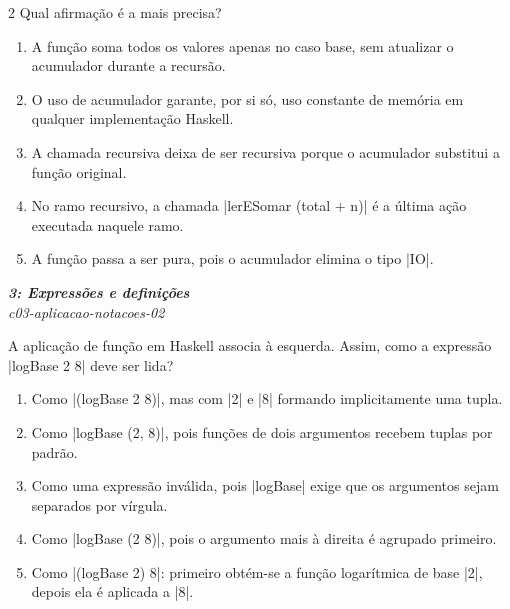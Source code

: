 \documentclass[a4paper,10pt,brazil]{article}
\begin{document}
\begin{multicols}{2}
Qual afirmação é a mais precisa?

\begin{enumerate}
  \item A função soma todos os valores apenas no caso base, sem atualizar o acumulador durante a recursão.

  \item O uso de acumulador garante, por si só, uso constante de memória em qualquer implementação Haskell.

  \item A chamada recursiva deixa de ser recursiva porque o acumulador substitui a função original.

  \item No ramo recursivo, a chamada \haskellinline|lerESomar (total + n)| é a última ação executada naquele ramo.

  \item A função passa a ser pura, pois o acumulador elimina o tipo \haskellinline|IO|.


\end{enumerate}

\begin{flushright}
  \footnotesize
  \textit{\textbf{3: Expressões e definições}}\\
  \textit{c03-aplicacao-notacoes-02}\\

\end{flushright}
A aplicação de função em Haskell associa à esquerda. Assim, como a expressão \haskellinline|logBase 2 8| deve ser lida?

\begin{enumerate}
  \item Como \haskellinline|(logBase 2 8)|, mas com \haskellinline|2| e \haskellinline|8| formando implicitamente uma tupla.

  \item Como \haskellinline|logBase (2, 8)|, pois funções de dois argumentos recebem tuplas por padrão.

  \item Como uma expressão inválida, pois \haskellinline|logBase| exige que os argumentos sejam separados por vírgula.

  \item Como \haskellinline|logBase (2 8)|, pois o argumento mais à direita é agrupado primeiro.

  \item Como \haskellinline|(logBase 2) 8|: primeiro obtém-se a função logarítmica de base \haskellinline|2|, depois ela é aplicada a \haskellinline|8|.



\end{enumerate}
\end{multicols}
\end{document}
